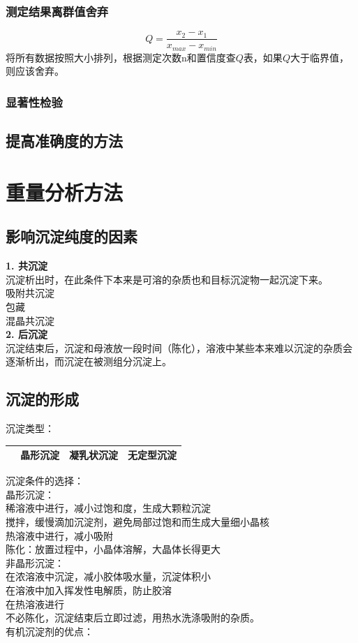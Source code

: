 \documentclass[utf8,a4paper,12pt]{ctexart}
\begin{document}
\subsubsection{测定结果离群值舍弃}
\[
	Q = \frac{x_2 - x_1}{x_{max} - x_{min}}
\]
将所有数据按照大小排列，根据测定次数n和置信度查$Q$表，如果$Q$大于临界值，则应该舍弃。\\
\subsubsection{显著性检验}
\subsection{提高准确度的方法}

\section{重量分析方法}
\subsection{影响沉淀纯度的因素}
{\bf 1. 共沉淀}\\
沉淀析出时，在此条件下本来是可溶的杂质也和目标沉淀物一起沉淀下来。\\
吸附共沉淀\\
包藏\\
混晶共沉淀\\
{\bf 2. 后沉淀}\\
沉淀结束后，沉淀和母液放一段时间（陈化），溶液中某些本来难以沉淀的杂质会逐渐析出，而沉淀在被测组分沉淀上。\\
\subsection{沉淀的形成}
沉淀类型：
\begin{table}[H]
\centering
\begin{tabular}{lccc}
\toprule
&晶形沉淀&凝乳状沉淀&无定型沉淀\\
\hline

\end{tabular}

\end{table}
沉淀条件的选择：\\
晶形沉淀：\\
稀溶液中进行，减小过饱和度，生成大颗粒沉淀\\
搅拌，缓慢滴加沉淀剂，避免局部过饱和而生成大量细小晶核\\
热溶液中进行，减小吸附\\
陈化：放置过程中，小晶体溶解，大晶体长得更大\\
非晶形沉淀：\\
在浓溶液中沉淀，减小胶体吸水量，沉淀体积小\\
在溶液中加入挥发性电解质，防止胶溶\\
在热溶液进行\\
不必陈化，沉淀结束后立即过滤，用热水洗涤吸附的杂质。\\
有机沉淀剂的优点：\\
\end{document}
